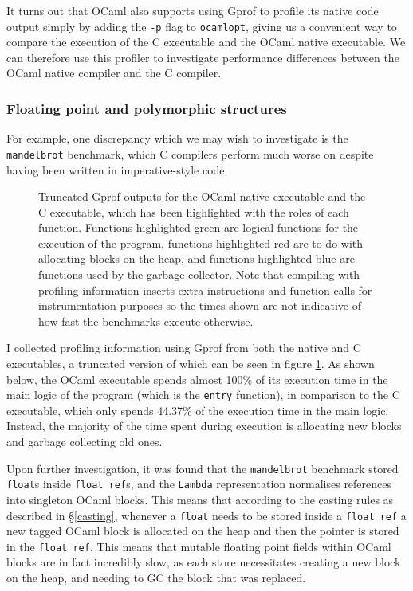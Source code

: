 \documentclass[12pt,a4paper,twoside,openright]{report}
\begin{document}
It turns out that OCaml also supports using Gprof to profile its native code 
output simply by adding the \texttt{-p} flag to \texttt{ocamlopt}, giving us a 
convenient way to compare the execution of the C executable and the OCaml 
native executable. We can therefore use this profiler to investigate 
performance differences between the OCaml native compiler and the C compiler.

\subsubsection{Floating point and polymorphic structures} \label{float-alloc}

For example, one discrepancy which we may wish to investigate is the 
\texttt{mandelbrot} benchmark, which C compilers perform much worse on despite 
having been written in imperative-style code.

\begin{figure}
    \centering
    
    \caption{Truncated Gprof outputs for the OCaml native executable and the C 
    executable, which has been highlighted with the roles of each function. 
    Functions highlighted green are logical functions for the execution of the 
    program, functions highlighted red are to do with allocating blocks on the 
    heap, and functions highlighted blue are functions used by the garbage 
    collector.
    Note that compiling with profiling information inserts extra instructions 
    and function calls for instrumentation purposes so the times shown are not 
    indicative of how fast the benchmarks execute otherwise.}
    \label{fig:mandelbrot-gprof}
\end{figure}

I collected profiling information using Gprof from both the native and C 
executables, a truncated version of which can be seen in figure 
\ref{fig:mandelbrot-gprof}. As shown below, the OCaml executable spends almost 
100\% of its execution time in the main logic of the program (which is the 
\texttt{entry} function), in comparison to the C executable, which only spends 
44.37\% of the execution time in the main logic. Instead, the majority of the 
time spent during execution is allocating new blocks and garbage collecting old 
ones.

Upon further investigation, it was found that the \texttt{mandelbrot} benchmark
stored \texttt{float}s inside \texttt{float ref}s, and the \texttt{Lambda}
representation normalises references into singleton OCaml blocks. This means
that according to the casting rules as described in \S\ref{casting}, whenever a
\texttt{float} needs to be stored inside a \texttt{float ref} a new tagged OCaml
block is allocated on the heap and then the pointer is stored in the
\texttt{float ref}. This means that mutable floating point fields within OCaml
blocks are in fact incredibly slow, as each store necessitates creating a new
block on the heap, and needing to GC the block that was replaced.
\end{document}
